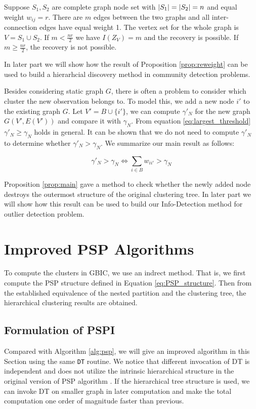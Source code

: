 \begin{proposition}\label{prop:reweight}
Suppose $S_1, S_2 $ are complete graph node set with $\lvert S_1\rvert=\lvert S_2\rvert=n$ and equal weight $w_{ij}=r$. There are $m$ edges between the two graphs and all inter-connection edges have equal weight 1. The vertex set for the whole graph is $V=S_1\cup S_2$. If $m <\frac{nr}{2}$  we have
$I(Z_V) = 
m$ and the recovery is possible. If $m\geq \frac{nr}{2}$, the recovery is not possible.
\end{proposition}

In later part we will show how the result of Proposition \ref{prop:reweight} can be used to build a hierarhcial discovery method in community detection problems.

Besides considering static graph $G$, there is often a problem to consider which cluster the new observation belongs to.
To model this, we add a new node $i'$ to the existing graph $G$.
Let $V'=B \cup \{i'\}$, we can compute $\gamma'_N$ for the new graph $G(V', E(V'))$ and compare it with $\gamma_N$. From equation \eqref{eq:largest_threshold} $\gamma'_N \geq \gamma_N$ holds in general. It can be shown that we do not need to compute $\gamma'_N$ to determine whether $\gamma'_N>\gamma_N$. We summarize our main result as follows:
\begin{proposition}\label{prop:main}
\begin{equation}
\gamma'_N > \gamma_N \iff  \sum_{i \in B} w_{ii'} > \gamma_N 
\end{equation}
\end{proposition}
Proposition \ref{prop:main} gave a method to check whether the newly added node destroys the outermost structure of the original clustering tree.  In later part we will show how this result can be used to build our Info-Detection method for outlier detection problem.
\section{Improved PSP Algorithms}\label{sec:alg}
To compute the clusters in GBIC, we use an indrect method. That is, we first compute the PSP structure defined in Equation \eqref{eq:PSP_structure}. Then from the established equivalence of the nested partition and the clustering tree, the hierarchical
clustering results are obtained.

\subsection{Formulation of PSPI}
Compared with Algorithm \ref{alg:psp}, we will give an improved algorithm in this Section using the same \texttt{DT} routine. We notice that different invocation of DT is independent and does not utilize the intrinsic hierarchical structure in the original version of PSP algorithm \cite{narayanan}. If the hierarchical tree structure is used, we can invoke DT on smaller graph in later computation and make the total computation one order of magnitude faster than previous.

